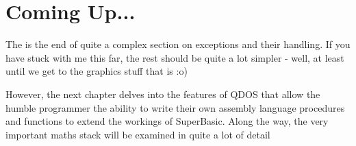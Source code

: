 \section{Coming Up...}
\label{ch6-the-end}%

The is the end of quite a complex section on exceptions and their
    handling. If you have stuck with me this far, the rest should be quite a
    lot simpler -{} well, at least until we get to the graphics stuff that is
   :o)

However, the next chapter delves into the features of QDOS that
    allow the humble programmer the ability to write their own assembly
    language procedures and functions to extend the workings of SuperBasic.
    Along the way, the very important maths stack will be examined in quite a
    lot of detail
